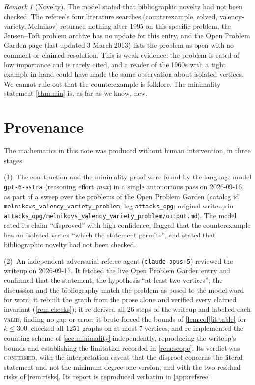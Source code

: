 \documentclass[11pt,a4paper]{article}
\theoremstyle{plain}
\theoremstyle{definition}
\theoremstyle{remark}
\newtheorem{remark}[theorem]{Remark}
\begin{document}
\begin{remark}[Novelty]\label{rem:novelty}
The model stated that bibliographic novelty had not been checked. The referee's four literature searches (counterexample, solved, valency-variety, Melnikov) returned nothing after 1995 on this specific problem, the Jensen--Toft problem archive has no update for this entry, and the Open Problem Garden page (last updated 3 March 2013) lists the problem as open with no comment or claimed resolution. This is weak evidence: the problem is rated of low importance and is rarely cited, and a reader of the 1960s with a tight example in hand could have made the same observation about isolated vertices. We cannot rule out that the counterexample is folklore. The minimality statement \cref{thm:min} is, as far as we know, new.
\end{remark}

\section{Provenance}\label{sec:provenance}

The mathematics in this note was produced without human intervention, in three stages.

(1)~The construction and the minimality proof were found by the language model \texttt{gpt-6-astra} (reasoning effort \emph{max}) in a single autonomous pass on 2026-09-16, as part of a sweep over the problems of the Open Problem Garden (catalog id \texttt{melnikovs\_valency\_variety\_problem}, leg \texttt{attacks\_opg}; original writeup in \texttt{attacks\_opg/melnikovs\_valency\_variety\_problem/output.md}). The model rated its claim ``disproved'' with high confidence, flagged that the counterexample has an isolated vertex ``which the statement permits'', and stated that bibliographic novelty had not been checked.

(2)~An independent adversarial referee agent (\texttt{claude-opus-5}) reviewed the writeup on 2026-09-17. It fetched the live Open Problem Garden entry and confirmed that the statement, the hypothesis ``at least two vertices'', the discussion and the bibliography match the problem as posed to the model word for word; it rebuilt the graph from the prose alone and verified every claimed invariant (\cref{rem:checks}); it re-derived all $26$ steps of the writeup and labelled each \textsc{valid}, finding no gap or error; it brute-forced the bounds of \cref{lem:col}\ref{it:table} for $k\le300$, checked all $1251$ graphs on at most $7$ vertices, and re-implemented the counting scheme of \cref{sec:minimality} independently, reproducing the writeup's bounds and establishing the limitation recorded in \cref{rem:scope}. Its verdict was \textsc{confirmed}, with the interpretation caveat that the disproof concerns the literal statement and not the minimum-degree-one version, and with the two residual risks of \cref{rem:risks}. Its report is reproduced verbatim in \cref{app:referee}.
\end{document}
